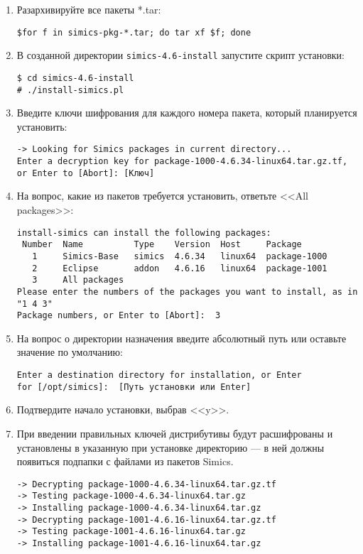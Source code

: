 \begin{enumerate}
\item Разархивируйте все пакеты *.tar:
\begin{lstlisting}
$for f in simics-pkg-*.tar; do tar xf $f; done
\end{lstlisting}
\item В созданной директории \texttt{simics-4.6-install} запустите скрипт установки:
\begin{lstlisting}
$ cd simics-4.6-install
# ./install-simics.pl
\end{lstlisting} 
    
\item Введите ключи шифрования для каждого номера пакета, который планируется установить:
\begin{lstlisting}
-> Looking for Simics packages in current directory...
Enter a decryption key for package-1000-4.6.34-linux64.tar.gz.tf,
or Enter to [Abort]: [Ключ]
\end{lstlisting} 

\item На вопрос, какие из пакетов требуется установить, ответьте <<All packages>>:
\begin{lstlisting}
install-simics can install the following packages:
 Number  Name          Type    Version  Host     Package
   1     Simics-Base   simics  4.6.34   linux64  package-1000
   2     Eclipse       addon   4.6.16   linux64  package-1001
   3     All packages
Please enter the numbers of the packages you want to install, as in "1 4 3"
Package numbers, or Enter to [Abort]:  3
\end{lstlisting}
    
\item На вопрос о директории назначения введите абсолютный путь или оставьте значение по умолчанию:
\begin{lstlisting}
Enter a destination directory for installation, or Enter
for [/opt/simics]:  [Путь установки или Enter]
\end{lstlisting}

\item Подтвердите начало установки, выбрав <<y>>.

\item При введении правильных ключей дистрибутивы будут расшифрованы и установлены в указанную при установке директорию --- в ней должны появиться подпапки с файлами из пакетов Simics.
\begin{lstlisting}
-> Decrypting package-1000-4.6.34-linux64.tar.gz.tf
-> Testing package-1000-4.6.34-linux64.tar.gz
-> Installing package-1000-4.6.34-linux64.tar.gz
-> Decrypting package-1001-4.6.16-linux64.tar.gz.tf
-> Testing package-1001-4.6.16-linux64.tar.gz
-> Installing package-1001-4.6.16-linux64.tar.gz


\end{lstlisting}
\end{enumerate}
